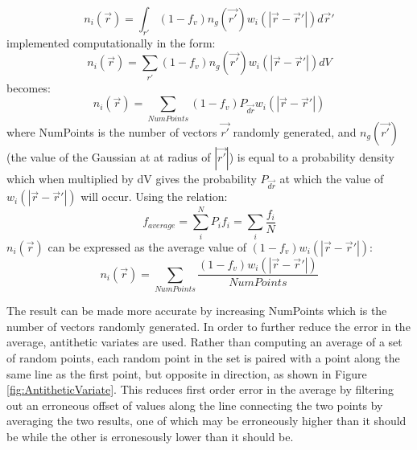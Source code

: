 \documentclass[double,12pt]{beavtex}
\begin{document}
\begin{equation}{n_i(\vec{r})= \int_{r'}{(1-f_v)n_g(\vec{r'})w_i(|\vec{r}-\vec{r}'|)} {d}\vec{r}'}\end{equation} implemented computationally in the form:
\begin{equation}{n_i(\vec{r})= \sum_{r'}{(1-f_v)n_g(\vec{r'})w_i(|\vec{r}-\vec{r}'|)dV}}\end{equation} becomes:
\begin{equation}{n_i(\vec{r})= \sum_{NumPoints}(1-f_v)P_{\vec{dr}}w_i(|\vec{r}-\vec{r}'|)}\end{equation} where NumPoints is the number of vectors $\vec{r'}$ randomly generated, and $n_g(\vec{r'})$ (the value of the Gaussian at at radius of $|\vec{r'}|$) is equal to a probability density which when multiplied by dV gives the probability $P_{\vec{dr}}$ at which the value of $w_i(|\vec{r}-\vec{r}'|)$ will occur. 
Using the relation:
\begin{displaymath}{f_{average}=\sum_i^N{P_if_i}=\sum_i{\frac{f_i}{N}}}\end{displaymath} $n_i(\vec{r})$ can be expressed as the average value of $(1-f_v)w_i(|\vec{r}-\vec{r}'|)$:
\begin{equation}{n_i(\vec{r})=\sum_{NumPoints}\frac{(1-f_v)w_i(|\vec{r}-\vec{r}'|)}{NumPoints}}\end{equation}

The result can be made more accurate by increasing NumPoints which is the number of vectors randomly generated. In order to further reduce the error in the average, antithetic variates are used. Rather than computing an average of a set of random points, each random point in the set is paired with a point along the same line as the first point, but opposite in direction, as shown in Figure \ref{fig:AntitheticVariate}. This reduces first order error in the average by filtering out an erroneous offset of values along the line connecting the two points by averaging the two results, one of which may be erroneously higher than it should be while the other is erronesously lower than it should be.
\end{document}
